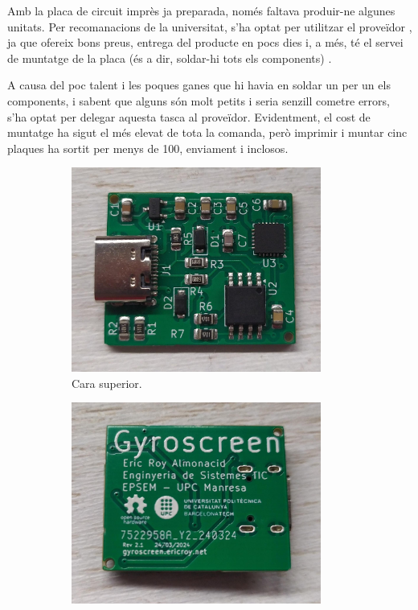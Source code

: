 Amb la placa de circuit imprès ja preparada, només faltava produir-ne algunes
unitats. Per recomanacions de la universitat, s'ha optat per utilitzar el
proveïdor , ja que ofereix bons preus, entrega del producte en pocs
dies i, a més, té el servei de muntatge de la placa (és a dir, soldar-hi tots els
components) \cite{JlcPcb}.

A causa del poc talent i les poques ganes que hi havia en soldar un per un els 
components, i sabent que alguns són molt petits i seria senzill cometre errors, 
s'ha optat per delegar aquesta tasca al proveïdor. Evidentment, el cost de 
muntatge ha sigut el més elevat de tota la comanda, però imprimir i muntar cinc 
plaques ha sortit per menys de \SI[round-mode=places,round-precision=0]{100}{\EUR},
enviament i  inclosos.

\begin{figure}[ht]
    \centering
    \begin{subfigure}{0.45\textwidth}
        \centering
        \includegraphics[width=0.9\textwidth]{images/device/top.jpeg}
        \caption{Cara superior.}
        \label{fig:printedpcb_top}
    \end{subfigure}
    \begin{subfigure}{0.45\textwidth}
        \centering
        \includegraphics[width=0.9\textwidth]{images/device/bottom.jpeg}

\end{subfigure}
\end{figure}
